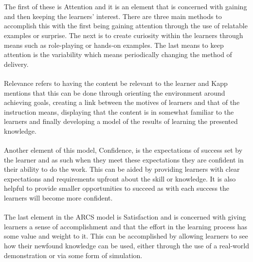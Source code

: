 \documentclass[conference]{IEEEtran}
\begin{document}
\\\\
The first of these is Attention and it is an element that is concerned with gaining and then keeping the learners’ interest. There are three main methods to accomplish this with the first being gaining attention through the use of relatable examples or surprise. The next is to create curiosity within the learners through means such as role-playing or hands-on examples. The last means to keep attention is the variability which means periodically changing the method of delivery\cite{Kapp2012a}.
\\\\
Relevance refers to having the content be relevant to the learner and Kapp\cite{Kapp2012a} mentions that this can be done through orienting the environment around achieving goals, creating a link between the motives of learners and that of the instruction means, displaying that the content is in somewhat familiar to the learners and finally developing a model of the results of learning the presented knowledge.
\\\\
Another element of this model, Confidence, is the expectations of success set by the learner and as such when they meet these expectations they are confident in their ability to do the work\cite{Kapp2012a}. This can be aided by providing learners with clear expectations and requirements upfront about the skill or knowledge. It is also helpful to provide smaller opportunities to succeed as with each success the learners will become more confident\cite{Kapp2012a}.
\\\\
The last element in the ARCS model is Satisfaction and is concerned with giving learners a sense of accomplishment and that the effort in the learning process has some value and weight to it\cite{Kapp2012a}. This can be accomplished by allowing learners to see how their newfound knowledge can be used, either through the use of a real-world demonstration or via some form of simulation\cite{Kapp2012a}.
\end{document}
